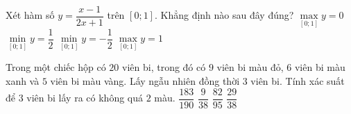 \begin{ex}%
Xét hàm số $y=\dfrac{x-1}{2x+1}$ trên $\left[0; 1\right]$. Khẳng định nào sau đây đúng?
\choice
	{\True $\displaystyle \max \limits_{\left[0; 1\right]} y = 0$}
	{$\displaystyle \min \limits_{\left[0; 1\right]} y =\dfrac{1}{2}$}
	{$\displaystyle \min \limits_{\left[0; 1\right]} y =-\dfrac{1}{2}$}
	{$\displaystyle \max \limits_{\left[0; 1\right]} y =1$}
\end{ex}
\begin{ex}%
Trong một chiếc hộp có $20$ viên bi, trong đó có $9$ viên bi màu đỏ, $6$ viên bi màu xanh và $5$ viên bi màu vàng. Lấy ngẫu nhiên đồng thời $3$ viên bi. Tính xác suất để $3$ viên bi lấy ra có không quá $2$ màu.
\choice
	{$\dfrac{183}{190}$}
	{$\dfrac{9}{38}$}
	{$\dfrac{82}{95}$}
	{\True $\dfrac{29}{38}$}
\end{ex}
